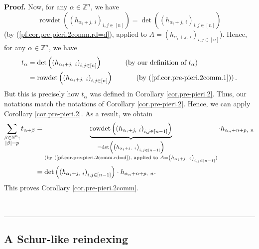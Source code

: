 \documentclass[numbers=enddot,12pt,final,onecolumn,notitlepage,english]{scrartcl}%
\theoremstyle{definition}
\newenvironment{proof}[1][Proof]{\noindent\textbf{#1.} }{\ \rule{0.5em}{0.5em}}
\let\sumnonlimits\sum
\renewcommand{\sum}{\sumnonlimits\limits}
\newenvironment{verlong}{}{}
\begin{document}
\begin{proof}
\begin{verlong}
Now, for any $\alpha\in\mathbb{Z}^{n}$, we have%
\begin{equation}
\operatorname*{rowdet}\left(  \left(  h_{\alpha_{i}+j,\ i}\right)
_{i,j\in\left[  n\right]  }\right)  =\det\left(  \left(  h_{\alpha_{i}%
+j,\ i}\right)  _{i,j\in\left[  n\right]  }\right)
\label{pf.cor.pre-pieri.2comm.1}%
\end{equation}
(by (\ref{pf.cor.pre-pieri.2comm.rd=d}), applied to $A=\left(  h_{\alpha
_{i}+j,\ i}\right)  _{i,j\in\left[  n\right]  }$). Hence, for any $\alpha
\in\mathbb{Z}^{n}$, we have%
\begin{align*}
t_{\alpha}  &  =\det\left(  \left(  h_{\alpha_{i}+j,\ i}\right)
_{i,j\in\left[  n\right]  }\right)  \ \ \ \ \ \ \ \ \ \ \left(  \text{by our
definition of }t_{\alpha}\right) \\
&  =\operatorname*{rowdet}\left(  \left(  h_{\alpha_{i}+j,\ i}\right)
_{i,j\in\left[  n\right]  }\right)  \ \ \ \ \ \ \ \ \ \ \left(  \text{by
(\ref{pf.cor.pre-pieri.2comm.1})}\right)  .
\end{align*}
But this is precisely how $t_{\alpha}$ was defined in Corollary
\ref{cor.pre-pieri.2}. Thus, our notations match the notations of Corollary
\ref{cor.pre-pieri.2}. Hence, we can apply Corollary \ref{cor.pre-pieri.2}. As
a result, we obtain%
\begin{align*}
\sum_{\substack{\beta\in\mathbb{N}^{n};\\\left\vert \beta\right\vert
=p}}t_{\alpha+\beta}  &  =\underbrace{\operatorname*{rowdet}\left(  \left(
h_{\alpha_{i}+j,\ i}\right)  _{i,j\in\left[  n-1\right]  }\right)
}_{\substack{=\det\left(  \left(  h_{\alpha_{i}+j,\ i}\right)  _{i,j\in\left[
n-1\right]  }\right)  \\\text{(by (\ref{pf.cor.pre-pieri.2comm.rd=d}), applied
to }A=\left(  h_{\alpha_{i}+j,\ i}\right)  _{i,j\in\left[  n-1\right]
}\text{)}}}\cdot h_{\alpha_{n}+n+p,\ n}\\
&  =\det\left(  \left(  h_{\alpha_{i}+j,\ i}\right)  _{i,j\in\left[
n-1\right]  }\right)  \cdot h_{\alpha_{n}+n+p,\ n}.
\end{align*}
This proves Corollary \ref{cor.pre-pieri.2comm}. \qedhere

\end{verlong}
\end{proof}

\subsection{A Schur-like reindexing}
\end{document}
